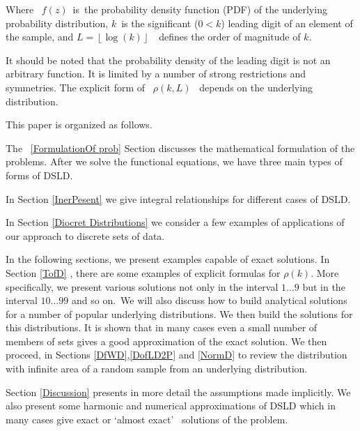 \documentclass[titlepage,fleqn]{article}%
\begin{document}
Where \ $f(z)$\ is\ the probability density function (PDF) of the underlying
probability distribution, $k$\ is the significant ($0<k$) leading digit of an
element of the sample, and $L=\left\lfloor \log(k)\right\rfloor $\ \ defines
the order of magnitude of $k$.

It should be noted that the probability density of the leading digit is not an
arbitrary function. It is limited by a number of strong restrictions and
symmetries. The explicit form of \ $\rho(k,L)$ \ depends on the underlying distribution.

This paper is organized as follows.

The\
\ref{FormulationOf prob}
Section discusses the mathematical formulation of the problems. After we solve
the functional equations, we have three main types of forms of DSLD.

In Section
\ref{InerPesent}
we give integral relationships for different cases of DSLD.

In Section
\ref{Diocret Distributions}
we consider a few examples of applications of our approach to discrete sets of data.

In the following sections, we present examples capable of exact solutions. In
Section
\ref{TofD}%
, there are some examples of explicit formulas for $\rho(k)$. More
specifically, we present various solutions not only in the interval $1\ldots9$
but in the interval $10\ldots99$ and so on.~We will also discuss how to build
analytical solutions for a number of popular underlying distributions. We then
build the solutions for this distributions. It is shown that in many cases
even a small number of members of sets gives a good approximation of the exact
solution. We then proceed, in Sections
\ref{DfWD},\ref{DofLD2P} and \ref{NormD}
to review the distribution with infinite area of a random sample from an
underlying distribution.

Section
\ref{Discussion}
presents in more detail the assumptions made implicitly. We also present some
harmonic and numerical approximations of DSLD which in many cases give exact
or `almost exact' \ solutions of the problem.
\end{document}
